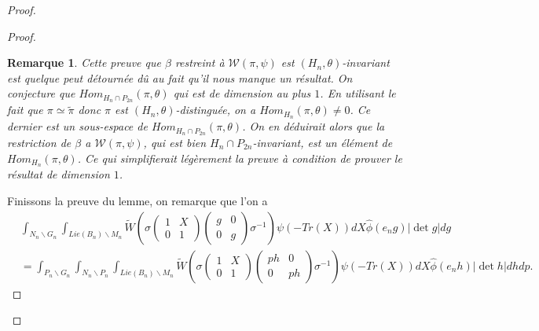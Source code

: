 \documentclass{amsart}
\newtheorem{remarque}{Remarque}[section]
\begin{document}
\begin{proof}
\begin{proof}
\begin{remarque}
Cette preuve que $\beta$ restreint à $\mathcal{W}(\pi, \psi)$ est $(H_n, \theta)$-invariant est quelque peut détournée dû au fait qu'il nous manque un résultat. On conjecture que $Hom_{H_n \cap P_{2n}}(\pi, \theta)$ qui est de dimension au plus $1$. En utilisant le fait que $\pi \simeq \widetilde{\pi}$ donc $\pi$ est $(H_n, \theta)$-distinguée, on a $Hom_{H_n}(\pi, \theta) \neq 0$. Ce dernier est un sous-espace de $Hom_{H_n \cap P_{2n}}(\pi, \theta)$. On en déduirait alors que la restriction de $\beta$ a $\mathcal{W}(\pi, \psi)$, qui est bien $H_n \cap P_{2n}$-invariant, est un élément de $Hom_{H_n}(\pi, \theta)$. Ce qui simplifierait légèrement la preuve à condition de prouver le résultat de dimension $1$.
\end{remarque}

Finissons la preuve du lemme, on remarque que l'on a
\begin{equation}
\begin{split}
&\int_{N_n \backslash G_n} \int_{Lie(B_n) \backslash M_n} \widetilde{W}\left(\sigma\begin{pmatrix}
1 & X \\
0 & 1
\end{pmatrix} \begin{pmatrix}
g & 0 \\
0 & g
\end{pmatrix} \sigma^{-1}\right) \psi(-Tr(X)) dX \widehat{\phi}(e_ng) |\det g| dg \\
&= \int_{P_n \backslash G_n} \int_{N_n \backslash P_n} \int_{Lie(B_n) \backslash M_n} \widetilde{W}\left(\sigma\begin{pmatrix}
1 & X \\
0 & 1
\end{pmatrix} \begin{pmatrix}
ph & 0 \\
0 & ph
\end{pmatrix} \sigma^{-1}\right) \psi(-Tr(X)) dX \widehat{\phi}(e_nh) |\det h| dh dp.
\end{split}
\end{equation}


\end{proof}
\end{proof}
\end{document}
